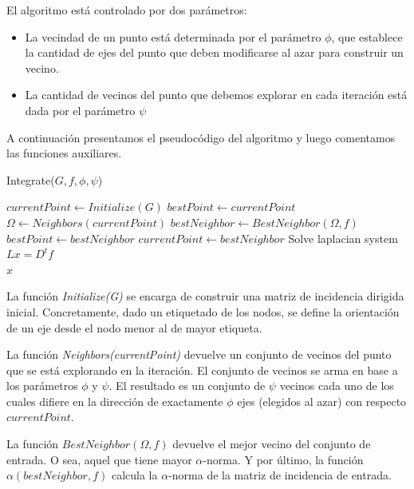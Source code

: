 \documentclass[conference,compsoc,a4paper]{IEEEtran}
\begin{document}
\smallskip

El algoritmo está controlado por dos parámetros:

\begin{itemize}
	\item La vecindad de un punto está determinada por el parámetro 
	$\phi$, que establece la cantidad de ejes del punto que deben 
	modificarse al azar para construir un vecino.
	\item La cantidad de vecinos del punto que debemos explorar en cada 
	iteración está dada por el parámetro $\psi$
\end{itemize}

A continuación presentamos el pseudocódigo del algoritmo y luego 
comentamos las funciones auxiliares.

\begin{algorithm}
    \caption{Integrate($G,f,\phi,\psi$)}
	\begin{algorithmic}
		\State $currentPoint \gets Initialize(G)$
		\State $bestPoint \gets currentPoint$
			\State $\Omega \gets Neighbors(currentPoint)$
			\State $bestNeighbor \gets BestNeighbor(\Omega,f)$
				\State $bestPoint \gets bestNeighbor$
			\EndIf
			\State $currentPoint \gets bestNeighbor$
		\EndWhile
		\State Solve laplacian system $L x = D^t f$ \\
		\Return $x$
	\end{algorithmic}
	\label{alg:alg1}
\end{algorithm}

La función \emph{Initialize(G)} se encarga de construir 
una matriz de incidencia dirigida inicial. Concretamente,
dado un etiquetado de los nodos, se define la orientación de un eje
desde el nodo menor 
al de mayor etiqueta. 

\smallskip

La función \emph{Neighbors(currentPoint)} devuelve un conjunto de 
vecinos del punto que se está explorando en la iteración. El conjunto 
de vecinos se arma en base a los parámetros $\phi$ y $\psi$. El 
resultado es un conjunto de $\psi$ vecinos cada uno de los cuales 
difiere en la dirección de exactamente $\phi$ ejes (elegidos al azar) 
con respecto $currentPoint$.

\smallskip

La función $BestNeighbor(\Omega,f)$ devuelve el mejor vecino del conjunto 
de entrada. O sea, aquel que tiene mayor $\alpha$-norma. Y por último, 
la función $\alpha(bestNeighbor,f)$ calcula la $\alpha$-norma de la matriz 
de incidencia de entrada.
\end{document}
